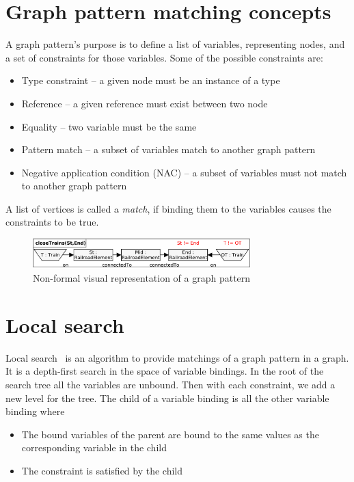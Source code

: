 \section{Graph pattern matching concepts}

A graph pattern's purpose is to define a list of variables, representing nodes, and a set of constraints for those variables. Some of the possible constraints are:

\begin{itemize}
	\item Type constraint -- a given node must be an instance of a type
	\item Reference -- a given reference must exist between two node
	\item Equality -- two variable must be the same
	\item Pattern match -- a subset of variables match to another graph pattern
	\item Negative application condition (NAC) -- a subset of variables must not match to another graph pattern
\end{itemize}
A list of vertices is called a \emph{match}, if binding them to the variables causes the constraints to be true.


\begin{figure}[h]
	\begin{center}
		\includegraphics[width=0.75\textwidth]{figures/pattern-visual.pdf}
		\caption{Non-formal visual representation of a graph pattern}
		\label{pattern-visual}
	\end{center}
\end{figure}


\section{Local search}

Local search~\cite{bur-marton-msc} is an algorithm to provide matchings of a graph pattern in a graph. It is a depth-first search in the space of variable bindings. In the root of the search tree all the variables are unbound. Then with each constraint, we add a new level for the tree. The child of a variable binding is all the other variable binding where 
\begin{itemize}
	\item The bound variables of the parent are bound to the same values as the corresponding variable in the child
	\item The constraint is satisfied by the child
\end{itemize}


